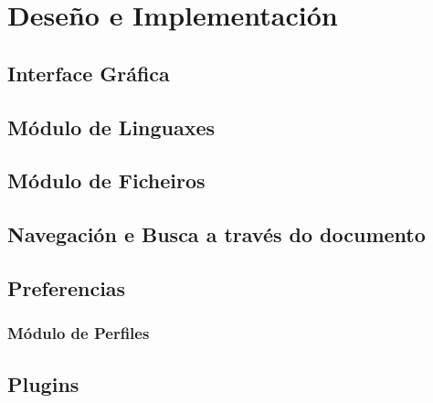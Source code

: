 \chapter{Deseño e Implementación}

\section{Interface Gráfica}

\section{Módulo de Linguaxes}

\section{Módulo de Ficheiros}

\section{Navegación e Busca a través do documento}

\section{Preferencias}

\subsection{Módulo de Perfiles}

\section{Plugins}

